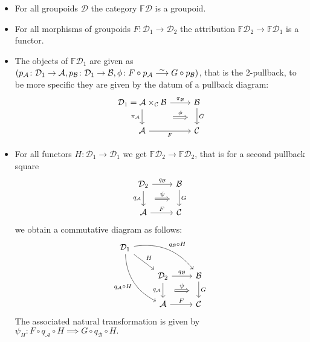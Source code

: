 \begin{itemize}
	\item 
	For all groupoids $ \mathcal{D} $ the category $ \mathbb{F} \mathcal{D} $ is a groupoid.
	
	\item 
	For all morphisms of groupoids $ F \colon \mathcal{D}_1 \to \mathcal{D}_2 $ the attribution $ \mathbb{F} \mathcal{D}_2 \to \mathbb{ F } \mathcal{D}_1 $ is a functor.
	
	\item 
	The objects of $ \mathbb{ F } \mathcal{D}_1 $ are given as $  ( p_{ \mathcal{ A } } \colon \mathcal{ D }_1 \to \mathcal{ A } , p_{ \mathcal{ B } } \colon \mathcal{ D }_1 \to \mathcal{ B } , \phi \colon F \circ p_{ \mathcal{ A } } \isomorphism  G \circ p_{ \mathcal{ B } } ) $,
	that is the 2-pullback, to be more specific they are given by the datum of a pullback diagram:
	\[
	\begin{tikzcd}	
		\mathcal{ D }_1 = \mathcal{ A } \times_{ \mathcal{ C } } \mathcal{ B }
		\ar[r, " \pi_{ \mathcal{ B } } "]
		\ar[r , shift right=4ex, shorten <=3pt, Rightarrow, shorten >=3pt, " \phi " ]
		\ar[d, " \pi_{ \mathcal{ A } }"']
		&
		\mathcal{ B }
		\ar[d, " G "]
		\\ 
		\mathcal{ A }
		\ar[r, " F "' ]
		&
		\mathcal{ C }
	\end{tikzcd}
	\]
	
	\item 
	For all functors $ H \colon \mathcal{ D }_1 \to \mathcal{ D }_1$ we get $ \mathbb{ F } \mathcal{ D }_2 \to \mathbb{ F } \mathcal{ D }_2$, that is for a second pullback square 
	\[
	\begin{tikzcd}	
		\mathcal{D}_2
		\ar[r, " q_{\mathcal{ B } } "]
		\ar[d, " q_{ \mathcal{ A } } "']
		\ar[r , shift right=4ex, shorten <=3pt, Rightarrow, shorten >=3pt, " \psi " ]
		&
		\mathcal{ B }
		\ar[d, " G "]
		\\
		\mathcal{ A } 
		\ar[r, " F "]
		&
		\mathcal{ C }
	\end{tikzcd}
	\]
	we obtain a commutative diagram as follows:
	\[
	\begin{tikzcd}
		\mathcal{ D }_1
		\ar[rrd, bend left, bend left, " q_{ \mathcal{ B } } \circ H "]
		\ar[rd, " H "]
		\ar[rdd, bend right," q_{ \mathcal{ A } } \circ H "']
		\\
		&
		\mathcal{ D }_2 
		\ar[r, " q_{ \mathcal{ B } }"]
		\ar[d, " q_{ \mathcal{ A } }"']
		\ar[r , shift right=4ex, shorten <=3pt, Rightarrow, shorten >=3pt, " \psi " ]
		&
		\mathcal{ B }
		\ar[d, " G "]
		\\
		&
		\mathcal{ A }
		\ar[r, " F "]
		&
		\mathcal{ C }
	\end{tikzcd}
	\]
	The associated natural transformation is given by 
	$\psi_H \colon F \circ q_{ \mathcal{A} } \circ H \implies G \circ q_{ \mathcal{ B } } \circ H.$
\end{itemize}

